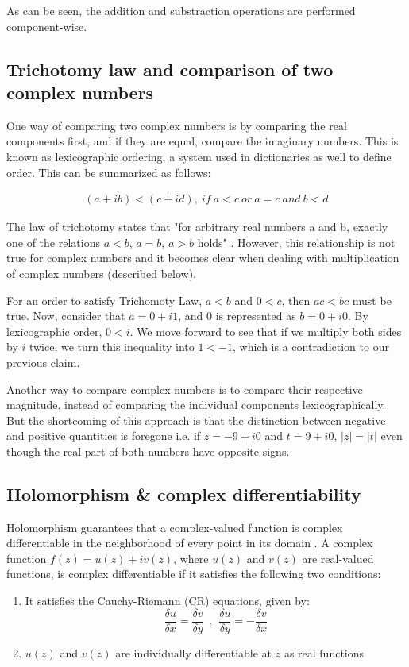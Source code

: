 As can be seen, the addition and substraction operations are performed 
component-wise.

\subsection{Trichotomy law and comparison of two complex numbers}
One way of comparing two complex numbers is by comparing the real components first, and if they are equal, compare the imaginary numbers. This is known as lexicographic ordering, a system used in dictionaries as well to define order. This can be summarized as follows:

\begin{equation}
\begin{aligned}
(a+ib) < (c+id), \ if \ a<c \ or \ a=c \ and \ b<d
\end{aligned}
\end{equation}

The law of trichotomy states that "for arbitrary real numbers a and b, exactly one of the relations $a<b$, $a=b$, $a>b$ holds" \cite{trichotomy}. However, this relationship is not true for complex numbers and it becomes clear when dealing with multiplication of complex numbers (described below).

For an order to satisfy Trichomoty Law, $a<b$ and $0<c$, then $ac<bc$ must be true. Now, consider that $a=0+i1$, and $0$ is represented as $b=0+i0$. By lexicographic order, $0<i$. We move forward to see that if we multiply both sides by $i$ twice, we turn this inequality into $1<-1$, which is a contradiction to our previous claim.

Another way to compare complex numbers is to compare their respective magnitude, instead of comparing the individual components lexicographically. But the shortcoming of this approach is that the distinction between negative and positive quantities is foregone i.e. if $z=-9+i0$ and $t=9+i0$, $|z|=|t|$ even though the real part of both numbers have opposite signs.  

\subsection{Holomorphism \& complex differentiability}

Holomorphism guarantees that a complex-valued function is complex differentiable in the neighborhood of every point in its domain \cite{trabelsi2018deep}.
A complex function $f(z)= u(z) + iv(z)$, where $u(z)$ and $v(z)$ are real-valued functions, is complex differentiable if it satisfies the following two conditions:
\begin{enumerate}

	\item It satisfies the Cauchy-Riemann (CR) equations, given by:
\begin{equation}\label{eq:compdiff}
\frac{\delta u}{\delta x} = \frac{\delta v}{\delta y} ~~,~~ \frac{\delta u}{\delta y} = - \frac{\delta v}{\delta x} 
\end{equation}
	\item $u(z)$ and $v(z)$ are individually differentiable at $z$ as real functions	
\end{enumerate} 



